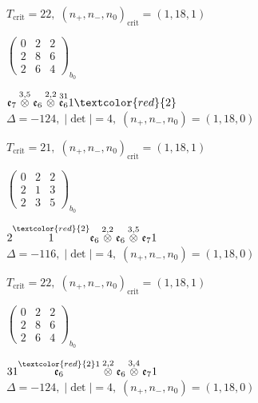 \documentclass[10pt]{article}
\begin{document}
\hspace{1em}$T_{\text{crit}}=22,\; (n_+,n_-,n_0)_{\text{crit}}=(1,18,1)$

\hspace{2em}$\left(\begin{smallmatrix}0 & 2 & 2 \\ 2 & 8 & 6 \\ 2 & 6 & 4\end{smallmatrix}\right)_{\!b_0}$

\smallskip

$\mathfrak{e}_7\overset{3,5}{\otimes}\mathfrak{e}_6\overset{2,2}{\otimes}\overset{31}{\mathfrak{e}_6}1\textcolor{red}{2}$ \quad $\Delta=-124,\; |\det|=4,\; (n_+,n_-,n_0)=(1,18,0)$

\hspace{1em}$T_{\text{crit}}=21,\; (n_+,n_-,n_0)_{\text{crit}}=(1,18,1)$

\hspace{2em}$\left(\begin{smallmatrix}0 & 2 & 2 \\ 2 & 1 & 3 \\ 2 & 3 & 5\end{smallmatrix}\right)_{\!b_0}$

\smallskip

$2\overset{\textcolor{red}{2}}{1}\mathfrak{e}_6\overset{2,2}{\otimes}\mathfrak{e}_6\overset{3,5}{\otimes}\mathfrak{e}_71$ \quad $\Delta=-116,\; |\det|=4,\; (n_+,n_-,n_0)=(1,18,0)$

\hspace{1em}$T_{\text{crit}}=22,\; (n_+,n_-,n_0)_{\text{crit}}=(1,18,1)$

\hspace{2em}$\left(\begin{smallmatrix}0 & 2 & 2 \\ 2 & 8 & 6 \\ 2 & 6 & 4\end{smallmatrix}\right)_{\!b_0}$

\smallskip

$31\overset{\textcolor{red}{2}1}{\mathfrak{e}_6}\overset{2,2}{\otimes}\mathfrak{e}_6\overset{3,4}{\otimes}\mathfrak{e}_71$ \quad $\Delta=-124,\; |\det|=4,\; (n_+,n_-,n_0)=(1,18,0)$
\end{document}
